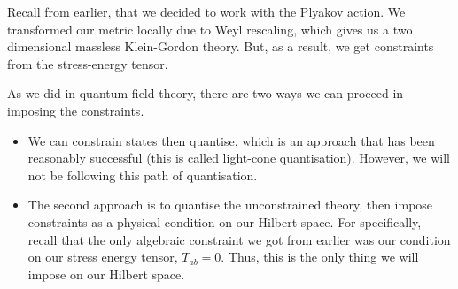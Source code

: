 \documentclass[11pt, oneside]{article}   	%
\theoremstyle{slanted}
\begin{document}
Recall from earlier, that we decided to work with the 
Plyakov action.
We transformed our metric locally due to Weyl rescaling, 
which gives us a two dimensional massless Klein-Gordon theory. 
But, as a result, we 
get constraints from the stress-energy tensor. 

As we did in quantum field theory, 
there are two ways we can proceed in imposing 
the constraints. 

\begin{itemize}
\item We can constrain states then quantise, which 
is an approach that has been reasonably successful
(this is called light-cone quantisation). However, we 
will not be following this path of quantisation. 
\item The second approach is 
to quantise the unconstrained 
theory, then impose constraints 
as a physical condition 
on our Hilbert space. For specifically, recall that the only algebraic 
constraint we got from earlier was our condition on our stress energy tensor, $ T_{ab }  = 0 $. 
Thus, this is the only thing we will impose on our Hilbert space. 


\end{itemize}
\end{document}
